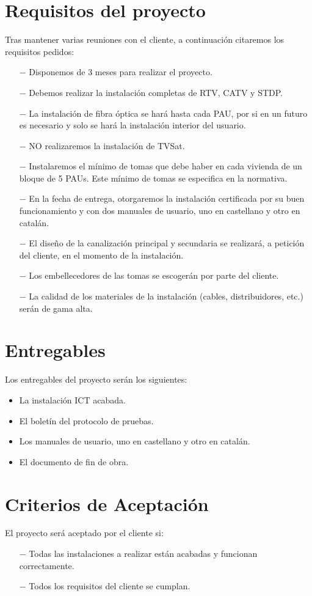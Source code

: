 \section{Requisitos del proyecto}
Tras mantener varias reuniones con el cliente, a continuación citaremos los requisitos pedidos:
\begin{itemize}
\item [$-$] Disponemos de 3 meses para realizar el proyecto.
\item [$-$] Debemos realizar la instalación completas de RTV, CATV y STDP.
\item [$-$] La instalación de fibra óptica se hará hasta cada PAU, por si en un futuro es necesario y solo se hará la instalación interior del usuario.
\item [$-$] NO  realizaremos la instalación de TVSat.
\item [$-$] Instalaremos el mínimo de tomas que debe haber en cada vivienda de un bloque de 5 PAUs. Este mínimo de tomas se especifica en la normativa.
\item [$-$] En la fecha de entrega, otorgaremos la instalación certificada por su buen funcionamiento y con dos manuales de usuario, uno en castellano y otro en catalán.
\item [$-$] El diseño de la canalización principal y secundaria se realizará, a petición del cliente, en el momento de la instalación.
\item [$-$] Los embellecedores de las tomas se escogerán por parte del cliente.
\item [$-$] La calidad de los materiales de la instalación (cables, distribuidores, etc.) serán de gama alta.
\end{itemize}
\section{Entregables}
Los entregables del proyecto serán los siguientes:
\begin{itemize}
\item La instalación ICT acabada.
\item El boletín del protocolo de pruebas.
\item Los manuales de usuario, uno en castellano y otro en catalán.
\item El documento de fin de obra.
\end{itemize}
\section{Criterios de Aceptación}
El proyecto será aceptado por el cliente si:
\begin{itemize}
\item [$-$] Todas las instalaciones a realizar están acabadas y funcionan correctamente.
\item[$-$] Todos los requisitos del cliente se cumplan. 
\end{itemize}
